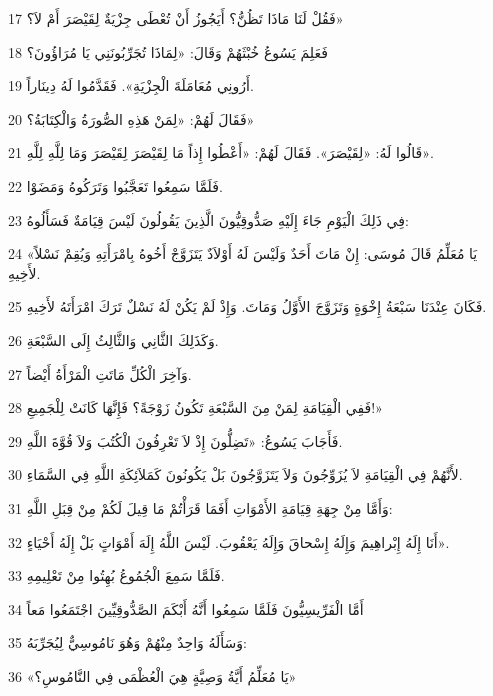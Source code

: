 \par 17 فَقُلْ لَنَا مَاذَا تَظُنُّ؟ أَيَجُوزُ أَنْ تُعْطَى جِزْيَةٌ لِقَيْصَرَ أَمْ لاَ؟»
\par 18 فَعَلِمَ يَسُوعُ خُبْثَهُمْ وَقَالَ: «لِمَاذَا تُجَرِّبُونَنِي يَا مُرَاؤُونَ؟
\par 19 أَرُونِي مُعَامَلَةَ الْجِزْيَةِ». فَقَدَّمُوا لَهُ دِينَاراً.
\par 20 فَقَالَ لَهُمْ: «لِمَنْ هَذِهِ الصُّورَةُ وَالْكِتَابَةُ؟»
\par 21 قَالُوا لَهُ: «لِقَيْصَرَ». فَقَالَ لَهُمْ: «أَعْطُوا إِذاً مَا لِقَيْصَرَ لِقَيْصَرَ وَمَا لِلَّهِ لِلَّهِ».
\par 22 فَلَمَّا سَمِعُوا تَعَجَّبُوا وَتَرَكُوهُ وَمَضَوْا.
\par 23 فِي ذَلِكَ الْيَوْمِ جَاءَ إِلَيْهِ صَدُّوقِيُّونَ الَّذِينَ يَقُولُونَ لَيْسَ قِيَامَةٌ فَسَأَلُوهُ:
\par 24 «يَا مُعَلِّمُ قَالَ مُوسَى: إِنْ مَاتَ أَحَدٌ وَلَيْسَ لَهُ أَوْلاَدٌ يَتَزَوَّجْ أَخُوهُ بِامْرَأَتِهِ وَيُقِمْ نَسْلاً لأَخِيهِ.
\par 25 فَكَانَ عِنْدَنَا سَبْعَةُ إِخْوَةٍ وَتَزَوَّجَ الأَوَّلُ وَمَاتَ. وَإِذْ لَمْ يَكُنْ لَهُ نَسْلٌ تَرَكَ امْرَأَتَهُ لأَخِيهِ.
\par 26 وَكَذَلِكَ الثَّانِي وَالثَّالِثُ إِلَى السَّبْعَةِ.
\par 27 وَآخِرَ الْكُلِّ مَاتَتِ الْمَرْأَةُ أَيْضاً.
\par 28 فَفِي الْقِيَامَةِ لِمَنْ مِنَ السَّبْعَةِ تَكُونُ زَوْجَةً؟ فَإِنَّهَا كَانَتْ لِلْجَمِيعِ!»
\par 29 فَأَجَابَ يَسُوعُ: «تَضِلُّونَ إِذْ لاَ تَعْرِفُونَ الْكُتُبَ وَلاَ قُوَّةَ اللَّهِ.
\par 30 لأَنَّهُمْ فِي الْقِيَامَةِ لاَ يُزَوِّجُونَ وَلاَ يَتَزَوَّجُونَ بَلْ يَكُونُونَ كَمَلاَئِكَةِ اللَّهِ فِي السَّمَاءِ.
\par 31 وَأَمَّا مِنْ جِهَةِ قِيَامَةِ الأَمْوَاتِ أَفَمَا قَرَأْتُمْ مَا قِيلَ لَكُمْ مِنْ قِبَلِ اللَّهِ:
\par 32 أَنَا إِلَهُ إِبْراهِيمَ وَإِلَهُ إِسْحاقَ وَإِلَهُ يَعْقُوبَ. لَيْسَ اللَّهُ إِلَهَ أَمْوَاتٍ بَلْ إِلَهُ أَحْيَاءٍ».
\par 33 فَلَمَّا سَمِعَ الْجُمُوعُ بُهِتُوا مِنْ تَعْلِيمِهِ.
\par 34 أَمَّا الْفَرِّيسِيُّونَ فَلَمَّا سَمِعُوا أَنَّهُ أَبْكَمَ الصَّدُّوقِيِّينَ اجْتَمَعُوا مَعاً
\par 35 وَسَأَلَهُ وَاحِدٌ مِنْهُمْ وَهُوَ نَامُوسِيٌّ لِيُجَرِّبَهُ:
\par 36 «يَا مُعَلِّمُ أَيَّةُ وَصِيَّةٍ هِيَ الْعُظْمَى فِي النَّامُوسِ؟»
